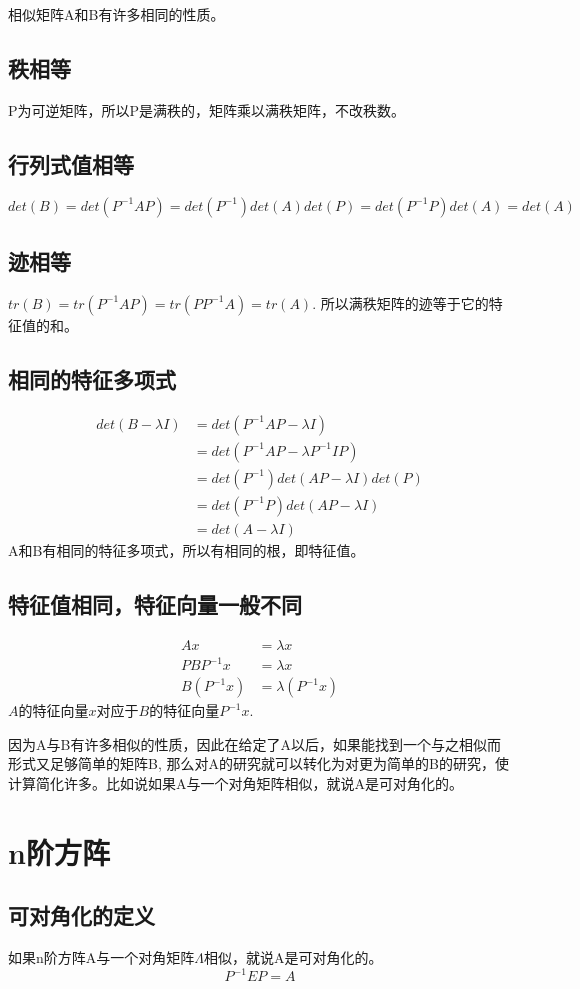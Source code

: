 \documentclass[]{article}
\begin{document}
相似矩阵A和B有许多相同的性质。
\subsection{秩相等}
P为可逆矩阵，所以P是满秩的，矩阵乘以满秩矩阵，不改秩数。
\subsection{行列式值相等}
$
det(B) = det(P^{-1}AP) = det(P^{-1})det(A)det(P) = det(P^{-1}P)det(A) = det(A)
$
\subsection{迹相等}
$ tr(B)=tr(P^{-1}AP)=tr(PP^{-1}A)=tr(A) $.
所以满秩矩阵的迹等于它的特征值的和。
\subsection{相同的特征多项式}
\[ 
\begin{aligned}
det(B-\lambda I) &= det(P^{-1}AP - \lambda I) \\
				 &= det(P^{-1}AP - \lambda P^{-1}IP) \\
				 &=	det(P^{-1})det(AP - \lambda I)det(P) \\
				 &= det(P^{-1}P)det(AP - \lambda I) \\
				 &=	det(A - \lambda I)
\end{aligned}
 \]
A和B有相同的特征多项式，所以有相同的根，即特征值。
 
\subsection{特征值相同，特征向量一般不同}
\[ 
\begin{aligned}
Ax &= \lambda x \\
PBP^{-1}x &= \lambda x \\
B(P^{-1}x) &= \lambda (P^{-1}x)
\end{aligned}
 \]
$ A $的特征向量$ x $对应于$ B $的特征向量$ P^{-1}x $.

因为A与B有许多相似的性质，因此在给定了A以后，如果能找到一个与之相似而形式又足够简单的矩阵B, 那么对A的研究就可以转化为对更为简单的B的研究，使计算简化许多。比如说如果A与一个对角矩阵相似，就说A是可对角化的。

\section{n阶方阵}
\subsection{可对角化的定义}
如果n阶方阵A与一个对角矩阵$\Lambda$相似，就说A是可对角化的。
\[ P^{-1}EP = A  \]
\end{document}
